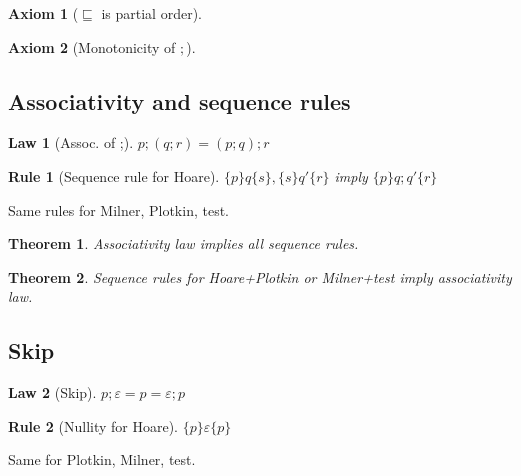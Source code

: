 \documentclass{article}
\begin{document}
\newcommand{\refines}{\sqsubseteq}
\newcommand{\eps}{\varepsilon}

\newcommand{\plotkin}[1]{\stackrel{#1}{\rightarrow}}
\newcommand{\milner}[1]{\stackrel{#1}{\leadsto}}


\newtheorem{axiom}{Axiom}
\newtheorem{law}{Law}
\newtheorem{rul}{Rule}  %
\newtheorem{theorem}{Theorem}
\newtheorem{definition}{Definition}




\begin{axiom} [$\refines$ is partial order]
\end{axiom}

\begin{axiom} [Monotonicity of $;$]
\end{axiom}


\subsection*{Associativity and sequence rules}

\begin{law}[Assoc. of ;]
$p;(q;r) = (p;q);r$
\end{law}

\begin{rul}[Sequence rule for Hoare]
$\{p\}q\{s\}, \{s\}q'\{r\}$ imply $\{p\}q;q'\{r\}$
\end{rul}

Same rules for Milner, Plotkin, test.

\begin{theorem}
Associativity law implies all sequence rules.
\end{theorem}

\begin{theorem}
Sequence rules for Hoare+Plotkin or Milner+test imply associativity law.
\end{theorem}


\subsection*{Skip}

\begin{law}[Skip]
$p;\eps = p = \eps;p$
\end{law}

\begin{rul}[Nullity for Hoare]
$\{p\}\eps\{p\}$
\end{rul}

Same for Plotkin, Milner, test.
\end{document}
